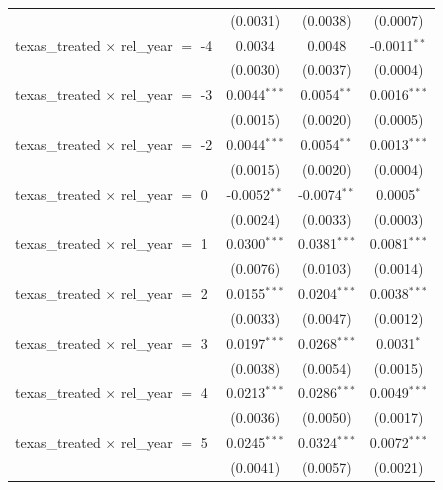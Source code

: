 \begin{tabular}{lccc}
                                                & (0.0031)       & (0.0038)       & (0.0007)\\   
   texas\_treated $\times$ rel\_year $=$ -4     & 0.0034         & 0.0048         & -0.0011$^{**}$\\   
                                                & (0.0030)       & (0.0037)       & (0.0004)\\   
   texas\_treated $\times$ rel\_year $=$ -3     & 0.0044$^{***}$ & 0.0054$^{**}$  & 0.0016$^{***}$\\   
                                                & (0.0015)       & (0.0020)       & (0.0005)\\   
   texas\_treated $\times$ rel\_year $=$ -2     & 0.0044$^{***}$ & 0.0054$^{**}$  & 0.0013$^{***}$\\   
                                                & (0.0015)       & (0.0020)       & (0.0004)\\   
   texas\_treated $\times$ rel\_year $=$ 0      & -0.0052$^{**}$ & -0.0074$^{**}$ & 0.0005$^{*}$\\   
                                                & (0.0024)       & (0.0033)       & (0.0003)\\   
   texas\_treated $\times$ rel\_year $=$ 1      & 0.0300$^{***}$ & 0.0381$^{***}$ & 0.0081$^{***}$\\   
                                                & (0.0076)       & (0.0103)       & (0.0014)\\   
   texas\_treated $\times$ rel\_year $=$ 2      & 0.0155$^{***}$ & 0.0204$^{***}$ & 0.0038$^{***}$\\   
                                                & (0.0033)       & (0.0047)       & (0.0012)\\   
   texas\_treated $\times$ rel\_year $=$ 3      & 0.0197$^{***}$ & 0.0268$^{***}$ & 0.0031$^{*}$\\   
                                                & (0.0038)       & (0.0054)       & (0.0015)\\   
   texas\_treated $\times$ rel\_year $=$ 4      & 0.0213$^{***}$ & 0.0286$^{***}$ & 0.0049$^{***}$\\   
                                                & (0.0036)       & (0.0050)       & (0.0017)\\   
   texas\_treated $\times$ rel\_year $=$ 5      & 0.0245$^{***}$ & 0.0324$^{***}$ & 0.0072$^{***}$\\   
                                                & (0.0041)       & (0.0057)       & (0.0021)\\   

\end{tabular}
